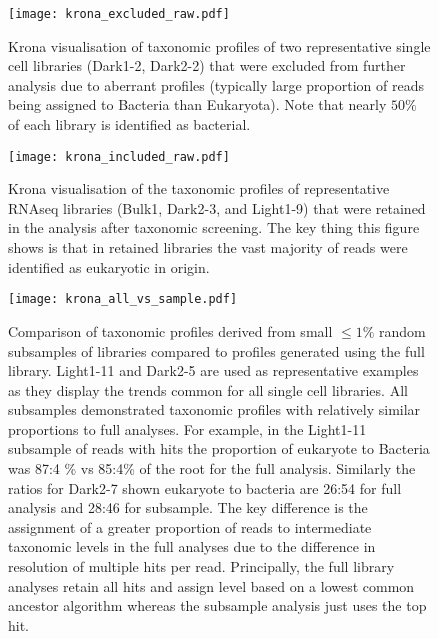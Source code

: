 \begin{figure}[h!]
    \texttt{[image: krona\_excluded\_raw.pdf]}
    \caption[Visualisation of taxonomically excluded libraries]{Krona visualisation of taxonomic profiles of two representative
        single cell libraries (Dark1-2, Dark2-2) that were excluded from further analysis due 
    to aberrant profiles (typically large proportion of reads being assigned
    to Bacteria than Eukaryota). Note that nearly \(50\%\) of each library is identified as bacterial.}
    \label{fig:krona_excluded}
\end{figure}

\begin{figure}[h!]
    \texttt{[image: krona\_included\_raw.pdf]}
    \caption[Visualisation of taxonomically included libraries]{
    Krona visualisation of the taxonomic profiles of representative 
    RNAseq libraries (Bulk1, Dark2-3, and Light1-9) that were retained 
    in the analysis after taxonomic screening.  The key thing this figure
    shows is that in retained libraries the vast majority of reads were 
    identified as eukaryotic in origin.
    }
    \label{fig:krona_included}
\end{figure}


\begin{figure}[hp]
    \texttt{[image: krona\_all\_vs\_sample.pdf]}
    \caption[Comparison of Subsample to Whole Library Profiles]{Comparison of taxonomic profiles derived from small \(\leq1\%\)
        random subsamples of libraries compared to profiles generated using the
        full library.  Light1-11 and Dark2-5 are used as representative examples
        as they display the trends common for all single cell libraries. 
        All subsamples demonstrated taxonomic profiles with relatively similar
        proportions to full analyses.  For example, in the Light1-11 subsample
        of reads with hits the proportion of eukaryote to Bacteria was 87:4 
        \% vs 85:4\% of the root for the full analysis. Similarly the ratios
        for Dark2-7 shown eukaryote to bacteria are 26:54 for full analysis
        and 28:46 for subsample. 
        The key difference is the assignment of a greater proportion of reads to 
        intermediate taxonomic levels in the full analyses due to the difference in 
        resolution of multiple hits per read.  Principally, the full library analyses
        retain all hits and assign level based on a lowest common ancestor algorithm
        whereas the subsample analysis just uses the top hit.
    }
    \label{fig:krona_sample_vs_full}
\end{figure}

